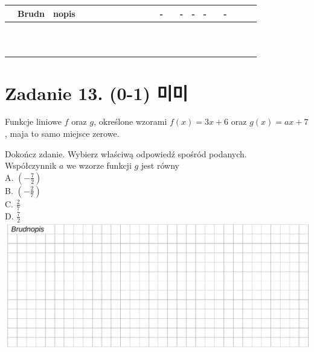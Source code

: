 \documentclass[10pt]{article}
\begin{document}
\begin{center}
\begin{tabular}{|c|c|c|c|c|c|c|c|c|c|c|c|c|c|c|c|c|c|c|c|c|c|}
\hline
 & Brudn & nopis &  &  &  &  &  &  &  &  &  & - &  & - & - & - &  & - &  &  &  \\
\hline
 &  &  &  &  &  &  &  &  &  &  &  &  &  &  &  &  &  &  &  &  &  \\
\hline
 &  &  &  &  &  &  &  &  &  &  &  &  &  &  &  &  &  &  &  &  &  \\
\hline
 &  &  &  &  &  &  &  &  &  &  &  &  &  &  &  &  &  &  &  &  &  \\
\hline
 &  &  &  &  &  &  &  &  &  &  &  &  &  &  &  &  &  &  &  &  &  \\
\hline
 &  &  &  &  &  &  &  &  &  &  &  &  &  &  &  &  &  &  &  &  &  \\
\hline
 &  &  &  &  &  &  &  &  &  &  &  &  &  &  &  &  &  &  &  &  &  \\
\hline
 &  &  &  &  &  &  &  &  &  &  &  &  &  &  &  &  &  &  &  &  &  \\
\hline
 &  &  &  &  &  &  &  &  &  &  &  &  &  &  &  &  &  &  &  &  &  \\
\hline
 &  &  &  &  &  &  &  &  &  &  &  &  &  &  &  &  &  &  &  &  &  \\
\hline
 &  &  &  &  &  &  &  &  &  &  &  &  &  &  &  &  &  &  &  &  &  \\
\hline
 &  &  &  &  &  &  &  &  &  &  &  &  &  &  &  &  &  &  &  &  &  \\
\hline
\end{tabular}
\end{center}

\section*{Zadanie 13. (0-1) 미미}
Funkcje liniowe \(f\) oraz \(g\), określone wzorami \(f(x)=3 x+6\) oraz \(g(x)=a x+7\), maja to samo miejsce zerowe.

Dokończ zdanie. Wybierz właściwą odpowiedź spośród podanych.\\
Współczynnik \(a\) we wzorze funkcji \(g\) jest równy\\
A. \(\left(-\frac{7}{2}\right)\)\\
B. \(\left(-\frac{2}{7}\right)\)\\
C. \(\frac{2}{7}\)\\
D. \(\frac{7}{2}\)\\
\includegraphics[max width=\textwidth, center]{2024_11_21_daeb5e5efb43dd4cb535g-12}
\end{document}
